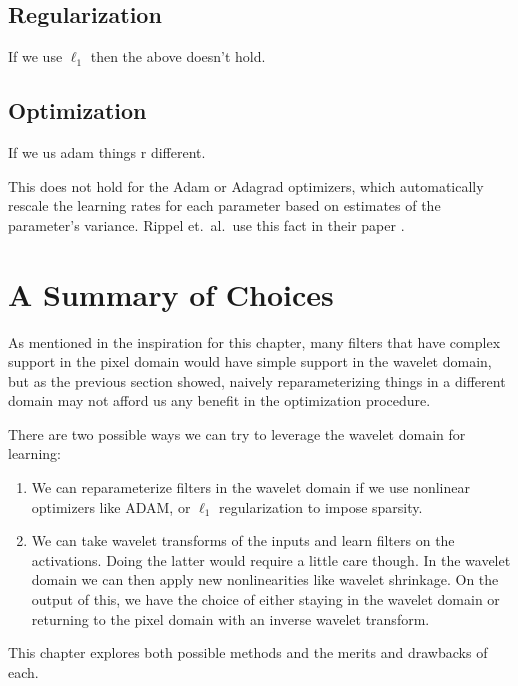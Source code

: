 \subsection{Regularization}
If we use $\ell_1$ then the above doesn't hold.

\subsection{Optimization}
If we us adam things r different.

This does not hold for the Adam \cite{kingma_adam:_2014} or Adagrad \cite{}
optimizers, which automatically rescale the learning rates for each parameter
based on estimates of the parameter's variance. Rippel et.\ al.\ use this fact
in their paper \cite{rippel_spectral_2015}.

\section{A Summary of Choices}
As mentioned in the inspiration for this chapter, many filters that
have complex support in the pixel domain would have simple support in the
wavelet domain, but as the previous section showed, naively reparameterizing
things in a different domain may not afford us any benefit in the optimization
procedure.

There are two possible ways we can try to leverage the wavelet domain for
learning: 

\begin{enumerate}
  \item We can reparameterize filters in the wavelet domain if we use nonlinear
optimizers like ADAM, or $\ell_1$ regularization to impose sparsity. 
  \item We can take wavelet transforms of the inputs and learn filters on the
    activations. Doing the latter would require a little care though. In the
    wavelet domain we can then apply new nonlinearities like wavelet shrinkage. 
    On the output of this, we have the choice of either staying in
    the wavelet domain or returning to the pixel domain with an inverse wavelet
    transform. 
\end{enumerate}

This chapter explores both possible methods and the merits and drawbacks of
each.

